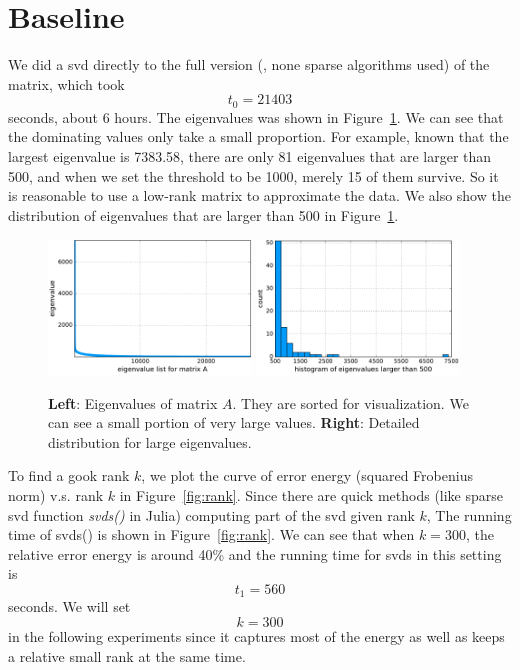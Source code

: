 \section{Baseline}

We did a svd directly to the full version
(\ie, none sparse algorithms used) of the matrix,
which took
\begin{equation}
    t_0=21403
\end{equation}
 seconds, about $6$ hours.
The eigenvalues was shown in Figure~\ref{fig:eig}.
We can see that the dominating values only take a small proportion.
For example,
known that the largest eigenvalue is 7383.58,
there are only 81 eigenvalues that are larger than 500,
and when we set the threshold to be 1000,
merely 15 of them survive.
So it is reasonable to use a low-rank matrix to approximate the data.
We also show the distribution of eigenvalues that are larger than 500
in Figure~\ref{fig:eig}.

\begin{figure}[!ht]
	\centering
	\includegraphics[width=0.48\textwidth]{fig/eigs.pdf}
    \hskip 0.2cm
	\includegraphics[width=0.48\textwidth]{fig/eig_large.pdf}
	\caption{\small
  		\textbf{Left}: Eigenvalues of matrix $A$.
          They are sorted for visualization.
          We can see a small portion of very large values.
        \textbf{Right}: Detailed distribution for large eigenvalues.}
	\label{fig:eig}
\end{figure}

To find a gook rank $k$,
we plot the curve of error energy (squared Frobenius norm) v.s. rank $k$
in Figure~\ref{fig:rank}.
Since there are quick methods (like sparse svd function \textit{svds()} in Julia)
computing part of the svd given rank $k$,
The running time of svds() is shown in Figure~\ref{fig:rank}.
We can see that when $k=300$,
the relative error energy is around 40\% and
the running time for svds in this setting is
\begin{equation}
    t_1=560
\end{equation}
seconds.
We will set
\begin{equation}
    k=300
\end{equation}
in the following experiments since it captures most of the energy
as well as keeps a relative small rank at the same time.

